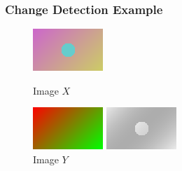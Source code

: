 \documentclass{beamer}
\begin{document}

\begin{frame}
  \frametitle{Change Detection Example}
  \begin{figure}
    \begin{minipage}[b]{0.40\linewidth}
      \centering
      \includegraphics[width=\textwidth]{./Images/GraphMatch/dataAfter.png}
      \caption{Image $X$}
    \end{minipage}
    \hfill
    \begin{minipage}[b]{0.40\linewidth}
      \centering
      \includegraphics[width=\textwidth]{./Images/GraphMatch/dataBefore.png}
      \caption{Image $Y$}
    \end{minipage}
    \vfill
    \begin{minipage}[b]{0.40\linewidth}
      \centering
      \includegraphics[width=\textwidth]{./Images/GraphMatch/naivediff.png}

\end{minipage}
\end{figure}
\end{frame}
\end{document}
